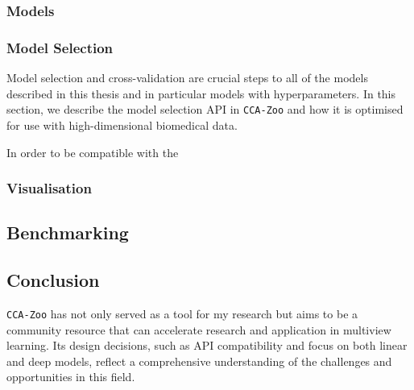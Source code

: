\subsubsection{Models}




\subsubsection{Model Selection}

Model selection and cross-validation are crucial steps to all of the models described in this thesis and in particular models with hyperparameters.
In this section, we describe the model selection API in \texttt{CCA-Zoo} and how it is optimised for use with high-dimensional biomedical data.


In order to be compatible with the


\subsubsection{Visualisation}

\subsection{Benchmarking}


\subsection{Conclusion}

\texttt{CCA-Zoo} has not only served as a tool for my research but aims to be a community resource that can accelerate research and application in multiview learning.
Its design decisions, such as API compatibility and focus on both linear and deep models, reflect a comprehensive understanding of the challenges and opportunities in this field.

